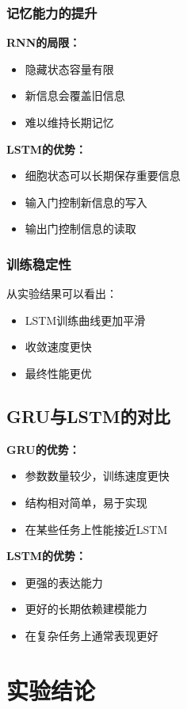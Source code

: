 \documentclass[a4paper]{article}
\begin{document}
\subsubsection{记忆能力的提升}
\textbf{RNN的局限：}
\begin{itemize}
    \item 隐藏状态容量有限
    \item 新信息会覆盖旧信息
    \item 难以维持长期记忆
\end{itemize}

\textbf{LSTM的优势：}
\begin{itemize}
    \item 细胞状态可以长期保存重要信息
    \item 输入门控制新信息的写入
    \item 输出门控制信息的读取
\end{itemize}

\subsubsection{训练稳定性}
从实验结果可以看出：
\begin{itemize}
    \item LSTM训练曲线更加平滑
    \item 收敛速度更快
    \item 最终性能更优
\end{itemize}

\subsection{GRU与LSTM的对比}
\textbf{GRU的优势：}
\begin{itemize}
    \item 参数数量较少，训练速度更快
    \item 结构相对简单，易于实现
    \item 在某些任务上性能接近LSTM
\end{itemize}

\textbf{LSTM的优势：}
\begin{itemize}
    \item 更强的表达能力
    \item 更好的长期依赖建模能力
    \item 在复杂任务上通常表现更好
\end{itemize}

\section{实验结论}
\end{document}
